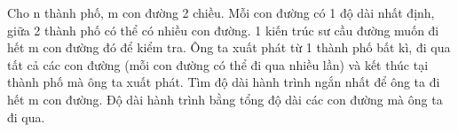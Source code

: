 Cho n thành phố, m con đường 2 chiều. Mỗi con đường có 1 độ dài nhất định, giữa 2 thành phố có thể có nhiều con đường. 1 kiến trúc sư cầu đường muốn đi hết m con đường đó để kiểm tra. Ông ta xuất phát từ 1 thành phố bất kì, đi qua tất cả các con đường (mỗi con đường có thể đi qua nhiều lần) và kết thúc tại thành phố mà ông ta xuất phát. Tìm độ dài hành trình ngắn nhất để ông ta đi hết m con đường. Độ dài hành trình bằng tổng độ dài các con đường mà ông ta đi qua.